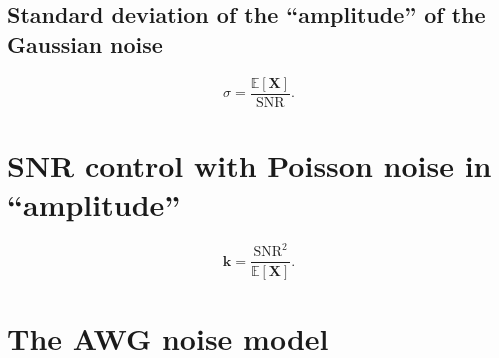 \subsection{Standard deviation of the ``amplitude'' of the Gaussian noise}
\begin{equation}
  \sigma = \frac{\mathbb{E}[\bm{X}]}{\text{SNR}}.
\end{equation}

\section{SNR control with Poisson noise in ``amplitude''}
\begin{equation}
  \bm{k} = \frac{\text{SNR}^2}{\mathbb{E}[\bm{X}]}.
\end{equation}

\section{The \acrlong{AWG} noise model} %
\label{sec:AWG}


